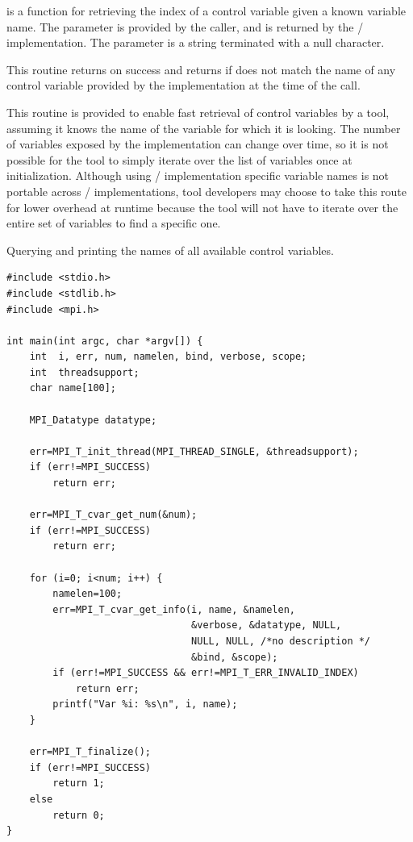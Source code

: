  is a function for retrieving the index of a control variable given a known variable name.
The  parameter is provided by the caller, and  is returned by the \MPI/ implementation.
The  parameter is a string terminated with a null character.

This routine returns  on success and returns
 if  does not match the name
of any control variable provided by the implementation at the time of the
call.

\begin{rationale}
This routine is provided to enable fast retrieval of control variables by a
tool, assuming it knows the name of the variable for which it is looking.
The number of variables exposed by the implementation can change over time,
so it is not possible for the tool to simply iterate over the list of
variables once at initialization.  Although using \MPI/ implementation
specific variable names is not portable across \MPI/ implementations, tool
developers may choose to take this route for lower overhead at runtime
because the tool will not have to iterate over the entire set of variables
to find a specific one.
\end{rationale}

\begin{example}
%
Querying and printing the names of all available control variables.

\begin{lstlisting}[language={[MPI]C}]
#include <stdio.h>
#include <stdlib.h>
#include <mpi.h>

int main(int argc, char *argv[]) {
    int  i, err, num, namelen, bind, verbose, scope;
    int  threadsupport;
    char name[100];

    MPI_Datatype datatype;

    err=MPI_T_init_thread(MPI_THREAD_SINGLE, &threadsupport);
    if (err!=MPI_SUCCESS)
        return err;

    err=MPI_T_cvar_get_num(&num);
    if (err!=MPI_SUCCESS)
        return err;

    for (i=0; i<num; i++) {
        namelen=100;
        err=MPI_T_cvar_get_info(i, name, &namelen,
                                &verbose, &datatype, NULL,
                                NULL, NULL, /*no description */
                                &bind, &scope);
        if (err!=MPI_SUCCESS && err!=MPI_T_ERR_INVALID_INDEX)
            return err;
        printf("Var %i: %s\n", i, name);
    }

    err=MPI_T_finalize();
    if (err!=MPI_SUCCESS)
        return 1;
    else
        return 0;
}
\end{lstlisting}

\end{example}

